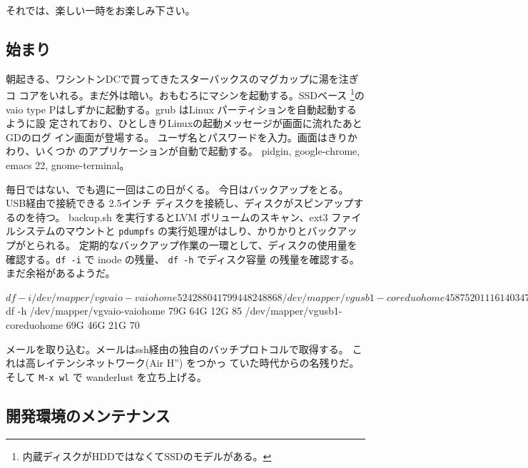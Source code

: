 \documentclass[mingoth,a4paper]{jsarticle}
\begin{document}
 それでは、楽しい一時をお楽しみ下さい。


\subsection{始まり}

朝起きる、ワシントンDCで買ってきたスターバックスのマグカップに湯を注ぎコ
コアをいれる。まだ外は暗い。おもむろにマシンを起動する。SSDベース
\footnote{内蔵ディスクがHDDではなくてSSDのモデルがある。}のvaio
type Pはしずかに起動する。grub はLinux パーティションを自動起動するように設
定されており、ひとしきりLinuxの起動メッセージが画面に流れたあとGDのログ
イン画面が登場する。
ユーザ名とパスワードを入力。画面はきりかわり、いくつか
のアプリケーションが自動で起動する。
pidgin, google-chrome, emacs 22, gnome-terminal。

毎日ではない、でも週に一回はこの日がくる。
今日はバックアップをとる。USB経由で接続できる 2.5インチ
ディスクを接続し、ディスクがスピンアップするのを待つ。
backup.sh を実行するとLVM ボリュームのスキャン、ext3 ファイルシステムのマウントと
\texttt{pdumpfs} の実行処理がはしり、かりかりとバックアップがとられる。
定期的なバックアップ作業の一環として、ディスクの使用量を確認する。\texttt{df -i} で inode の残量、 \texttt{df -h} でディスク容量
の残量を確認する。まだ余裕があるようだ。

\begin{commandline}
$ df -i 
/dev/mapper/vgvaio-vaiohome
                     5242880  417994 4824886    8%
/dev/mapper/vgusb1-coreduohome
                     4587520 1116140 3471380   25%
$ df -h 
/dev/mapper/vgvaio-vaiohome
                       79G   64G   12G  85%
/dev/mapper/vgusb1-coreduohome
                       69G   46G   21G  70%

\end{commandline}

メールを取り込む。メールはssh経由の独自のバッチプロトコルで取得する。
これは高レイテンシネットワーク(Air H'') をつかっ
ていた時代からの名残りだ。
そして \texttt{M-x wl} で wanderlust を立ち上げる。

\subsection{開発環境のメンテナンス}
\end{document}

